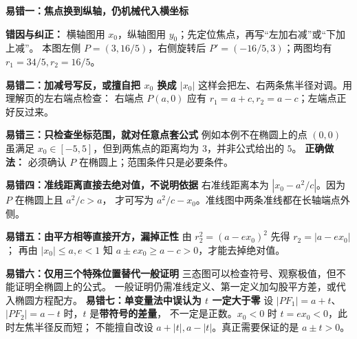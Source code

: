 \clearpage
\begin{trapbox}
\textbf{\textcolor{CTrap}{易错一：焦点换到纵轴，仍机械代入横坐标}}

\textbf{错因与纠正：} 横轴图用 $x_0$，纵轴图用 $y_0$；先定位焦点，再写“左加右减”或“下加上减”。
本图左侧 $P=(3,16/5)$，右侧旋转后 $P'=(-16/5,3)$；两图均有 $r_1=34/5,r_2=16/5$。

\textbf{\textcolor{CTrap}{易错二：加减号写反，或擅自把 $x_0$ 换成 $|x_0|$}}
这样会把左、右两条焦半径对调。用理解页的左右端点检查：
右端点 $P(a,0)$ 应有 $r_1=a+c,r_2=a-c$；左端点正好反过来。
\end{trapbox}
\clearpage
\begin{trapbox}
\textbf{\textcolor{CTrap}{易错三：只检查坐标范围，就对任意点套公式}}
例如本例不在椭圆上的点 $(0,0)$ 虽满足 $x_0\in[-5,5]$，但到两焦点的距离均为 $3$，并非公式给出的 $5$。
\textbf{正确做法：} 必须确认 $P$ 在椭圆上；范围条件只是必要条件。

\medskip
\textbf{\textcolor{CTrap}{易错四：准线距离直接去绝对值，不说明依据}}
右准线距离本为 $|x_0-a^2/c|$。因为 $P$ 在椭圆上且 $a^2/c>a$，
才可写为 $a^2/c-x_0$。准线图中两条准线都在长轴端点外侧。

\medskip
\textbf{\textcolor{CTrap}{易错五：由平方相等直接开方，漏掉正性}}
由 $r_2^2=(a-ex_0)^2$ 先得 $r_2=|a-ex_0|$；
再由 $|x_0|\le a,e<1$ 知 $a\pm ex_0\ge a-c>0$，才能去掉绝对值。

\medskip
\textbf{\textcolor{CTrap}{易错六：仅用三个特殊位置替代一般证明}}
三态图可以检查符号、观察极值，但不能证明全椭圆上的公式。
一般证明仍需准线定义、第一定义加勾股平方差，或代入椭圆方程配方。
\medskip
\textbf{\textcolor{CTrap}{易错七：单变量法中误认为 $t$ 一定大于零}}
设 $|PF_1|=a+t$、$|PF_2|=a-t$ 时，$t$ 是\textbf{带符号的差量}，
不一定是正数。$x_0<0$ 时 $t=ex_0<0$，此时左焦半径反而短；
不能擅自改设 $a+|t|,a-|t|$。真正需要保证的是 $a\pm t>0$。
\end{trapbox}
